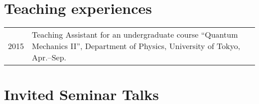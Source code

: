 \documentclass[12pt]{article}
\begin{document}
\section*{Teaching experiences}
\begin{table}[H]
  \begin{tabular}{lp{6in}}
    2015 & Teaching Assistant for an undergraduate course ``Quantum Mechanics II'', Department of Physics, University of Tokyo, Apr.--Sep.
  \end{tabular}
\end{table}



\nocite{*}

\section*{Invited Seminar Talks}
\end{document}
